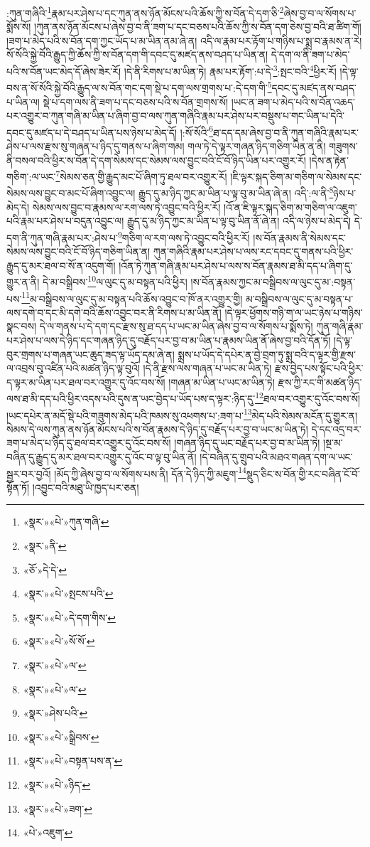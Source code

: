 :ཀུན་གཞིའི་\footnote{«སྣར་»«པེ་»ཀུན་གཞི་}རྣམ་པར་ཤེས་པ་དང་ཀུན་ནས་ཉོན་མོངས་པའི་ཆོས་ཀྱི་ས་བོན་དེ་དག་ཅི་\footnote{«སྣར་»ནི་}ཞེས་བྱ་བ་ལ་སོགས་པ་སྨོས་སོ། །ཀུན་ནས་ཉོན་མོངས་པ་ཞེས་བྱ་བ་ནི་ཟག་པ་དང་བཅས་པའི་ཆོས་ཀྱི་ས་བོན་དག་ཅེས་བྱ་བའི་ཐ་ཚིག་གོ། །ཟག་པ་མེད་པའི་ས་བོན་དག་ཀྱང་ཡོད་པ་མ་ཡིན་ནམ་ཞེ་ན། འདི་ལ་རྣམ་པར་རྟོག་པ་གཉིས་པ་སྨྲ་བ་རྣམས་ན་རེ། སོ་སོའི་སྐྱེ་བོའི་རྒྱུད་ཀྱི་ཆོས་ཀྱི་ས་བོན་དག་གི་དབང་དུ་མཛད་ནས་བཤད་པ་ཡིན་ན། དེ་དག་ལ་ནི་ཟག་པ་མེད་པའི་ས་བོན་ཡང་མེད་དོ་ཞེས་ཟེར་རོ། །དེ་ནི་རིགས་པ་མ་ཡིན་ཏེ། རྣམ་པར་རྟོག་:པ་དེ་\footnote{«ཅོ་»དེ་དེ་}:སྤང་བའི་\footnote{«སྣར་»«པེ་»སྤངས་པའི་}ཕྱིར་རོ། །དེ་ལྟ་བས་ན་སོ་སོའི་སྐྱེ་བོའི་རྒྱུད་ལ་ས་བོན་གང་དག་སྡེ་པ་དག་ལས་གྲགས་པ་:དེ་དག་གི་\footnote{«སྣར་»«པེ་»དེ་དག་གིས་}དབང་དུ་མཛད་ནས་བཤད་པ་ཡིན་ལ། སྡེ་པ་དག་ལས་ནི་ཟག་པ་དང་བཅས་པའི་ས་བོན་གྲགས་སོ། །ཡང་ན་ཟག་པ་མེད་པའི་ས་བོན་འཆད་པར་འགྱུར་བ་ཀུན་གཞི་མ་ཡིན་པ་ཞིག་བྱ་བ་ལས་ཀུན་གཞིའི་རྣམ་པར་ཤེས་པར་བསྡུས་པ་གང་ཡིན་པ་དེའི་དབང་དུ་མཛད་པ་དེ་བཤད་པ་ཡིན་པས་ཉེས་པ་མེད་དོ། །:སོ་སོའི་\footnote{«སྣར་»«པེ་»སོ་སོ་}ཐ་དད་དམ་ཞེས་བྱ་བ་ནི་ཀུན་གཞིའི་རྣམ་པར་ཤེས་པ་ལས་རྫས་སུ་གཞན་པ་ཉིད་དུ་གནས་པ་ཞིག་གམ། གལ་ཏེ་དེ་ལྟར་གཞན་ཉིད་གཅིག་ཡིན་ན་ནི། གཟུགས་ནི་བསལ་བའི་ཕྱིར་ས་བོན་དེ་དག་སེམས་དང་སེམས་ལས་བྱུང་བའི་ངོ་བོ་ཉིད་ཡིན་པར་འགྱུར་རོ། །དེས་ན་རྟེན་གཅིག་:ལ་ཡང་\footnote{«སྣར་»«པེ་»ལ་}སེམས་ཅན་གྱི་རྒྱུད་མང་པོ་ཞིག་ཏུ་ཐལ་བར་འགྱུར་རོ། །ཇི་ལྟར་སྐད་ཅིག་མ་གཅིག་ལ་སེམས་དང་སེམས་ལས་བྱུང་བ་མང་པོ་ཞིག་འབྱུང་ལ། རྒྱུད་དུ་མ་ཉིད་ཀྱང་མ་ཡིན་པ་ལྟ་བུ་མ་ཡིན་ཞེ་ན། འདི་:ལ་ནི་\footnote{«སྣར་»«པེ་»ལ་}ཉེས་པ་མེད་དེ། སེམས་ལས་བྱུང་བ་རྣམས་ལ་རག་ལས་ཏེ་འབྱུང་བའི་ཕྱིར་རོ། །འོ་ན་ཇི་ལྟར་སྐད་ཅིག་མ་གཅིག་ལ་འཇུག་པའི་རྣམ་པར་ཤེས་པ་བདུན་འབྱུང་ལ། རྒྱུད་དུ་མ་ཉིད་ཀྱང་མ་ཡིན་པ་ལྟ་བུ་ཡིན་ནོ་ཞེ་ན། འདི་ལ་ཉེས་པ་མེད་དེ། དེ་དག་ནི་ཀུན་གཞི་རྣམ་པར་:ཤེས་པ་\footnote{«སྣར་»ཤེས་པའི་}གཅིག་ལ་རག་ལས་ཏེ་འབྱུང་བའི་ཕྱིར་རོ། །ས་བོན་རྣམས་ནི་སེམས་དང་སེམས་ལས་བྱུང་བའི་ངོ་བོ་ཉིད་གཅིག་ཡིན་ན། ཀུན་གཞིའི་རྣམ་པར་ཤེས་པ་ལས་རང་དབང་དུ་གནས་པའི་ཕྱིར་རྒྱུད་དུ་མར་ཐལ་བ་སོ་ན་འདུག་གོ། །འོན་ཏེ་ཀུན་གཞི་རྣམ་པར་ཤེས་པ་ལས་ས་བོན་རྣམས་ཐ་མི་དད་པ་ཞིག་དུ་གྱུར་ན་ནི། དེ་མ་བསྒྲིབས་\footnote{«སྣར་»«པེ་»སྒྲིབས་}ལ་ལུང་དུ་མ་བསྟན་པའི་ཕྱིར། །ས་བོན་རྣམས་ཀྱང་མ་བསྒྲིབས་ལ་ལུང་དུ་མ་:བསྟན་པས་\footnote{«སྣར་»«པེ་»བསྟན་པས་ན་}མ་བསྒྲིབས་ལ་ལུང་དུ་མ་བསྟན་པའི་ཆོས་འབྱུང་བ་ཁོ་ནར་འགྱུར་གྱི། མ་བསྒྲིབས་ལ་ལུང་དུ་མ་བསྟན་པ་ལས་དགེ་བ་དང་མི་དགེ་བའི་ཆོས་འབྱུང་བར་ནི་རིགས་པ་མ་ཡིན་ནོ། །དེ་ལྟར་ཕྱོགས་གཉི་ག་ལ་ཡང་ཉེས་པ་གཉིས་སྣང་བས། དེ་ལ་གནས་པ་དེ་དག་དང་རྫས་སུ་ཐ་དད་པ་ཡང་མ་ཡིན་ཞེས་བྱ་བ་ལ་སོགས་པ་སྨོས་ཏེ། ཀུན་གཞི་རྣམ་པར་ཤེས་པ་ལས་དེ་ཉིད་དང་གཞན་ཉིད་དུ་བརྗོད་པར་བྱ་བ་མ་ཡིན་པ་རྣམས་ཡིན་ནོ་ཞེས་བྱ་བའི་དོན་ཏོ། །དེ་ལྟ་བུར་གྲགས་པ་གཞན་ཡང་ཆུད་ཟད་ལྟ་ཡོད་དམ་ཞེ་ན། སྨྲས་པ་ཡོད་དེ་དཔེར་ན་བྱེ་བྲག་ཏུ་སྨྲ་བའི་ད་ལྟར་གྱི་རྫས་ལ་འབྲས་བུ་འཛིན་པའི་མཚན་ཉིད་ལྟ་བུའོ། །དེ་ནི་རྫས་ལས་གཞན་པ་ཡང་མ་ཡིན་ཏེ། རྫས་བྱེད་པས་སྟོང་པའི་ཕྱིར་ད་ལྟར་མ་ཡིན་པར་ཐལ་བར་འགྱུར་དུ་འོང་བས་སོ། །གཞན་མ་ཡིན་པ་ཡང་མ་ཡིན་ཏེ། རྫས་ཀྱི་རང་གི་མཚན་ཉིད་ལས་ཐ་མི་དད་པའི་ཕྱིར་འདས་པའི་དུས་ན་ཡང་བྱེད་པ་ཡོད་པས་ད་ལྟར་:ཉིད་དུ་\footnote{«སྣར་»«པེ་»ཉིད་}ཐལ་བར་འགྱུར་དུ་འོང་བས་སོ། །ཡང་དཔེར་ན་མདོ་སྡེ་པའི་གཟུགས་མེད་པའི་ཁམས་སུ་འཕགས་པ་:ཟག་པ་\footnote{«སྣར་»«པེ་»ཟག་}མེད་པའི་སེམས་མངོན་དུ་གྱུར་ན། སེམས་དེ་ལས་ཀུན་ནས་ཉོན་མོངས་པའི་ས་བོན་རྣམས་དེ་ཉིད་དུ་བརྗོད་པར་བྱ་བ་ཡང་མ་ཡིན་ཏེ། དེ་དང་འདྲ་བར་ཟག་པ་མེད་པ་ཉིད་དུ་ཐལ་བར་འགྱུར་དུ་འོང་བས་སོ། །གཞན་ཉིད་དུ་ཡང་བརྗོད་པར་བྱ་བ་མ་ཡིན་ཏེ། །སྔ་མ་བཞིན་དུ་རྒྱུད་དུ་མར་ཐལ་བར་འགྱུར་དུ་འོང་བ་ལྟ་བུ་ཡིན་ནོ། །དེ་བཞིན་དུ་གྲུབ་པའི་མཐའ་གཞན་དག་ལ་ཡང་སྦྱར་བར་བྱའོ། །མོད་ཀྱི་ཞེས་བྱ་བ་ལ་སོགས་པས་ནི། དོན་དེ་ཉིད་ཀྱི་མཇུག་\footnote{«པེ་»འཇུག་}སྡུད་ཅིང་ས་བོན་གྱི་རང་བཞིན་ངོ་བོ་སྟོན་ཏོ། །འབྱུང་བའི་མཐུ་ཡི་ཁྱད་པར་ཅན། 